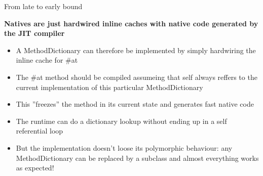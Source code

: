 \documentclass{beamer}
\begin{document}
\begin{frame}{From late to early bound}

    {\bf Natives are just hardwired inline caches with native code generated by the JIT compiler}
    \begin{itemize}
            \item A MethodDictionary can therefore be implemented by simply hardwiring the inline cache for \#at
            \item The \#at method should be compiled assumeing that self always reffers to the current implementation of this particular MethodDictionary
            \item This ''freezes'' the method in its current state and generates fast native code
            \item The runtime can do a dictionary lookup without ending up in a self referential loop
            \item But the implementation doesn't loose its polymorphic behaviour: any MethodDictionary can be replaced by a subclass and almost everything works as expected!
    \end{itemize}
\end{frame}
\end{document}
